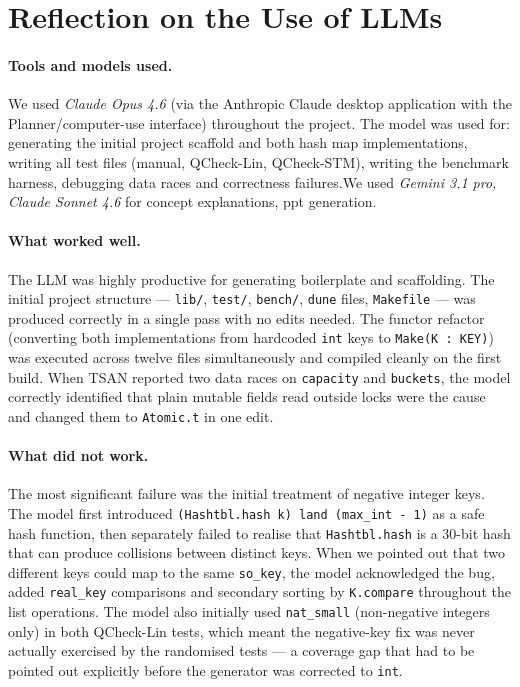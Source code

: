 \documentclass[11pt,a4paper]{article}
\begin{document}
\section{Reflection on the Use of LLMs}
\label{sec:llm}

\paragraph{Tools and models used.}
We used \emph{Claude Opus 4.6} (via the Anthropic Claude desktop application
with the Planner/computer-use interface) throughout the project. The model was
used for: generating the initial project scaffold and both hash map
implementations, writing all test files (manual, QCheck-Lin, QCheck-STM),
writing the benchmark harness, debugging data races and correctness failures.We used \emph{Gemini 3.1 pro, Claude Sonnet 4.6} for concept explanations, ppt generation.

\paragraph{What worked well.}
The LLM was highly productive for generating boilerplate and scaffolding.
The initial project structure --- \texttt{lib/}, \texttt{test/}, \texttt{bench/},
\texttt{dune} files, \texttt{Makefile} --- was produced correctly in a single
pass with no edits needed. The functor refactor (converting both implementations
from hardcoded \texttt{int} keys to \texttt{Make(K~:~KEY)}) was executed across
twelve files simultaneously and compiled cleanly on the first build.  When TSAN reported two data races on \texttt{capacity}
and \texttt{buckets}, the model correctly identified that plain mutable fields
read outside locks were the cause and changed them to \texttt{Atomic.t}
in one edit.

\paragraph{What did not work.}
The most significant failure was the initial treatment of negative integer keys.
The model first introduced \texttt{(Hashtbl.hash k) land (max\_int - 1)} as a
safe hash function, then separately failed to realise that \texttt{Hashtbl.hash}
is a 30-bit hash that can produce collisions between distinct keys. When we
pointed out that two different keys could map to the same \texttt{so\_key}, the
model acknowledged the bug, added \texttt{real\_key} comparisons and secondary
sorting by \texttt{K.compare} throughout the list operations. The model also initially used \texttt{nat\_small} (non-negative integers only)
in both QCheck-Lin tests, which meant the negative-key fix was never actually
exercised by the randomised tests --- a coverage gap that had to be pointed out
explicitly before the generator was corrected to \texttt{int}.
\end{document}
